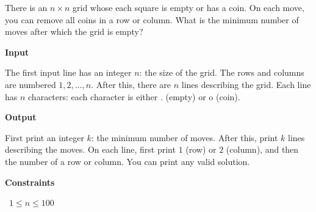 There is an $n \times n$ grid whose each square is empty or has a coin. On each move, you can remove all coins in a row or column.
What is the minimum number of moves after which the grid is empty?

\vspace{0.3cm}\noindent\textbf{Input}

The first input line has an integer $n$: the size of the grid. The rows and columns are numbered $1,2,\dots,n$.
After this, there are $n$ lines describing the grid. Each line has $n$ characters: each character is either . (empty) or o (coin).

\vspace{0.3cm}\noindent\textbf{Output}

First print an integer $k$: the minimum number of moves. After this, print $k$ lines describing the moves.
On each line, first print $1$ (row) or $2$ (column), and then the number of a row or column. You can print any valid solution.

\vspace{0.3cm}\noindent\textbf{Constraints}

\textbullet\ $1 \le n \le 100$